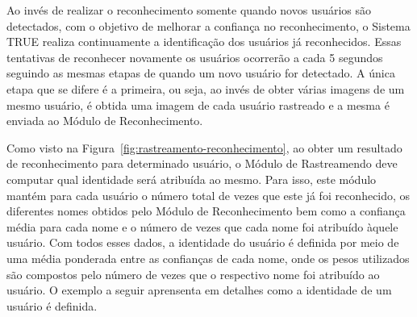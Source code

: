 	
	Ao invés de realizar o reconhecimento somente quando novos usuários são detectados, com o objetivo de melhorar a confiança no reconhecimento, o Sistema TRUE realiza continuamente a identificação dos usuários já reconhecidos. Essas tentativas de reconhecer novamente os usuários ocorrerão a cada 5 segundos seguindo as mesmas etapas de quando um novo usuário for detectado. A única etapa que se difere é a primeira, ou seja, ao invés de obter várias imagens de um mesmo usuário, é obtida uma imagem de cada usuário rastreado e a mesma é enviada ao Módulo de Reconhecimento.

	Como visto na Figura~\ref{fig:rastreamento-reconhecimento}, ao obter um resultado de reconhecimento para determinado usuário, o Módulo de Rastreamendo deve computar qual identidade será atribuída ao mesmo. Para isso, este módulo mantém para cada usuário o número total de vezes que este já foi reconhecido, os diferentes nomes obtidos pelo Módulo de Reconhecimento bem como a confiança média para cada nome e o número de vezes que cada nome foi atribuído àquele usuário. Com todos esses dados, a identidade do usuário é definida por meio de uma média ponderada entre as confianças de cada nome, onde os pesos utilizados são compostos pelo número de vezes que o respectivo nome foi atribuído ao usuário. O exemplo a seguir aprensenta em detalhes como a identidade de um usuário é definida.

